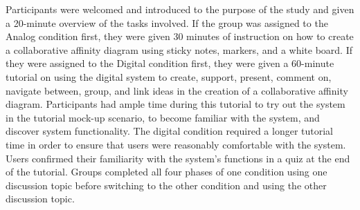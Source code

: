 \documentclass{sigchi}
\begin{document}
Participants were welcomed and introduced to the purpose of the study and given a 20-minute overview of the tasks involved. If the group was assigned to the Analog condition first, they were given 30 minutes of instruction on how to create a collaborative affinity diagram using sticky notes, markers, and a white board. If they were assigned to the Digital condition first, they were given a 60-minute tutorial on using the digital system to create, support, present, comment on, navigate between, group, and link ideas in the creation of a collaborative affinity diagram. Participants had ample time during this tutorial to try out the system in the tutorial mock-up scenario, to become familiar with the system, and discover system functionality. The digital condition required a longer tutorial time in order to ensure that users were reasonably comfortable with the system. Users confirmed their familiarity with the system's functions in a quiz at the end of the tutorial. Groups completed all four phases of one condition using one discussion topic before switching to the other condition and using the other discussion topic.
\end{document}
